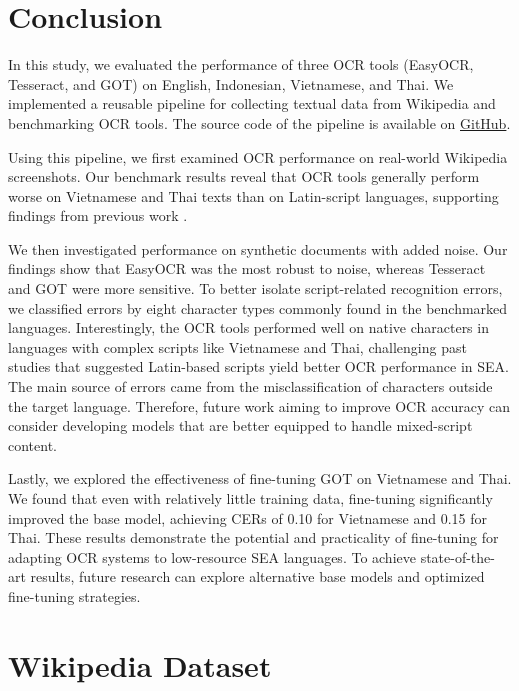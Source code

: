 \documentclass[12pt,oneside]{memoir}
\begin{document}
\chapter{Conclusion}

In this study, we evaluated the performance of three OCR tools (EasyOCR, Tesseract, and GOT) on English, Indonesian, Vietnamese, and Thai.
We implemented a reusable pipeline for collecting textual data from Wikipedia and benchmarking OCR tools.
The source code of the pipeline is available on \href{https://github.com/jasonqiu212/ocr-benchmarking-on-sea-languages}{GitHub}.

Using this pipeline, we first examined OCR performance on real-world Wikipedia screenshots.
Our benchmark results reveal that OCR tools generally perform worse on Vietnamese and Thai texts than on Latin-script languages, supporting findings from previous work \parencite{ignat-etal-2022}.

We then investigated performance on synthetic documents with added noise.
Our findings show that EasyOCR was the most robust to noise, whereas Tesseract and GOT were more sensitive.
To better isolate script-related recognition errors, we classified errors by eight character types commonly found in the benchmarked languages.
Interestingly, the OCR tools performed well on native characters in languages with complex scripts like Vietnamese and Thai, challenging past studies that suggested Latin-based scripts yield better OCR performance in SEA.
The main source of errors came from the misclassification of characters outside the target language. 
Therefore, future work aiming to improve OCR accuracy can consider developing models that are better equipped to handle mixed-script content.

Lastly, we explored the effectiveness of fine-tuning GOT on Vietnamese and Thai.
We found that even with relatively little training data, fine-tuning significantly improved the base model, achieving CERs of 0.10 for Vietnamese and 0.15 for Thai.
These results demonstrate the potential and practicality of fine-tuning for adapting OCR systems to low-resource SEA languages.
To achieve state-of-the-art results, future research can explore alternative base models and optimized fine-tuning strategies.

\printbibliography[title={References}]

\clearpage
\appendix
\renewcommand{\chaptername}{Appendix}

\chapter{Wikipedia Dataset}
\end{document}
